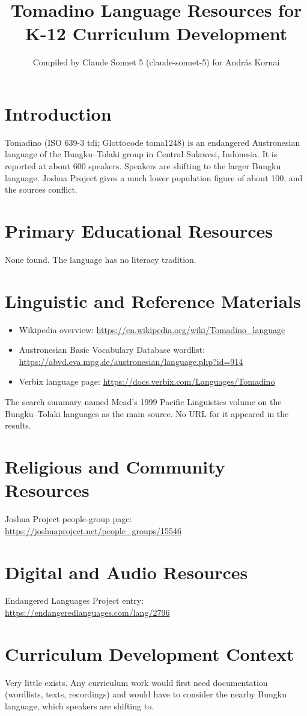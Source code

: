 \documentclass[12pt]{article}
\title{Tomadino Language Resources for K-12 Curriculum Development}
\author{Compiled by Claude Sonnet 5 (claude-sonnet-5) for Andr\'as Kornai}
\date{}
\begin{document}
\maketitle
\section{Introduction}
Tomadino (ISO 639-3 tdi; Glottocode toma1248) is an endangered Austronesian language of the Bungku--Tolaki group in Central Sulawesi, Indonesia. It is reported at about 600 speakers. Speakers are shifting to the larger Bungku language. Joshua Project gives a much lower population figure of about 100, and the sources conflict.
\section{Primary Educational Resources}
None found. The language has no literacy tradition.
\section{Linguistic and Reference Materials}
\begin{itemize}
\item Wikipedia overview: \url{https://en.wikipedia.org/wiki/Tomadino_language}
\item Austronesian Basic Vocabulary Database wordlist: \url{https://abvd.eva.mpg.de/austronesian/language.php?id=914}
\item Verbix language page: \url{https://docs.verbix.com/Languages/Tomadino}
\end{itemize}
The search summary named Mead's 1999 Pacific Linguistics volume on the Bungku--Tolaki languages as the main source. No URL for it appeared in the results.
\section{Religious and Community Resources}
Joshua Project people-group page: \url{https://joshuaproject.net/people_groups/15546}
\section{Digital and Audio Resources}
Endangered Languages Project entry: \url{https://endangeredlanguages.com/lang/2796}
\section{Curriculum Development Context}
Very little exists. Any curriculum work would first need documentation (wordlists, texts, recordings) and would have to consider the nearby Bungku language, which speakers are shifting to.
\end{document}
